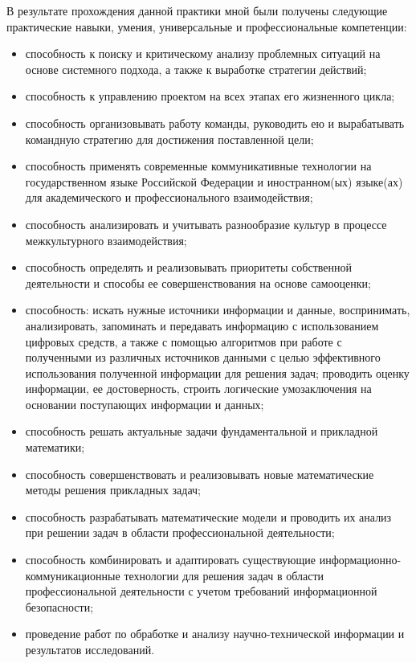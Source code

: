 В результате прохождения данной практики мной были получены следующие практические навыки, умения, универсальные и профессиональные компетенции:
\begin{itemize}
    \item способность к поиску и критическому анализу проблемных ситуаций на основе системного подхода, а также к выработке стратегии действий;
    \item способность к управлению проектом на всех этапах его жизненного цикла;
    \item способность организовывать работу команды, руководить ею и вырабатывать командную стратегию для достижения поставленной цели;
    \item способность применять современные коммуникативные технологии на государственном языке Российской Федерации и иностранном(ых) языке(ах) для академического и профессионального взаимодействия;
    \item способность анализировать и учитывать разнообразие культур в процессе межкультурного взаимодействия;
    \item способность определять и реализовывать приоритеты собственной деятельности и способы ее совершенствования на основе самооценки;
    \item способность: искать нужные источники информации и данные, воспринимать, анализировать, запоминать и передавать информацию с использованием цифровых средств, а также с помощью алгоритмов при работе с полученными из различных источников данными с целью эффективного использования полученной информации для решения задач; проводить оценку информации, ее достоверность, строить логические умозаключения на основании поступающих информации и данных;
    \item способность решать актуальные задачи фундаментальной и прикладной математики;
    \item способность совершенствовать и реализовывать новые математические методы решения прикладных задач;
    \item способность разрабатывать математические модели и проводить их анализ при решении задач в области профессиональной деятельности;
    \item способность комбинировать и адаптировать существующие информационно-коммуникационные технологии для решения задач в области профессиональной деятельности с учетом требований информационной безопасности;
    \item проведение работ по обработке и анализу научно-технической информации и результатов исследований.
\end{itemize}

